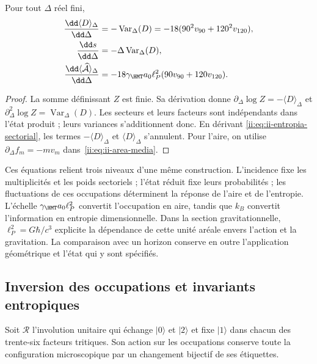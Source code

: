 \begin{proposition}
Pour tout $\Delta$ réel fini,
\begin{align}
 \frac{\dd\langle D\rangle_\Delta}{\dd\Delta}
 &=-\operatorname{Var}_\Delta(D)
   =-18(90^2v_{90}+120^2v_{120}),\\
 \frac{\dd s}{\dd\Delta}
 &=-\Delta\operatorname{Var}_\Delta(D),
 \label{ii:eq:ii-respuesta-entropica}\\
 \frac{\dd\langle\widehat{\mathcal A}\rangle_\Delta}{\dd\Delta}
 &=-18\gamma_{\HMT}a_0\ell_P^2(90v_{90}+120v_{120}).
 \label{ii:eq:ii-respuesta-areal}
\end{align}
\end{proposition}
\begin{proof}
La somme définissant $Z$ est finie. Sa dérivation donne
$\partial_\Delta\log Z=-\langle D\rangle_\Delta$ et
$\partial_\Delta^2\log Z=\operatorname{Var}_\Delta(D)$.
Les secteurs et leurs facteurs sont indépendants dans l'état produit ;
leurs variances s'additionnent donc. En dérivant
\eqref{ii:eq:ii-entropia-sectorial}, les termes
$-\langle D\rangle_\Delta$ et $\langle D\rangle_\Delta$
s'annulent. Pour l'aire, on utilise
$\partial_\Delta f_m=-mv_m$ dans~\eqref{ii:eq:ii-area-media}.
\end{proof}

Ces équations relient trois niveaux d'une même construction.
L'incidence fixe les multiplicités et les poids sectoriels ;
l'état réduit fixe leurs probabilités ; les fluctuations de ces
occupations déterminent la réponse de l'aire et de l'entropie.
L'échelle $\gamma_{\HMT}a_0\ell_P^2$ convertit l'occupation en aire,
tandis que $k_B$ convertit l'information en entropie dimensionnelle.
Dans la section gravitationnelle, $\ell_P^2=G\hbar/c^3$ explicite
la dépendance de cette unité aréale envers l'action et la gravitation.
La comparaison avec un horizon conserve en outre l'application
géométrique et l'état qui y sont spécifiés.

\subsection{Inversion des occupations et invariants entropiques}
\label{ii:sec:ii-inversion-sectorial}

Soit $\mathcal R$ l'involution unitaire qui échange $|0\rangle$
et $|2\rangle$ et fixe $|1\rangle$ dans chacun des trente-six
facteurs tritiques. Son action sur les occupations conserve toute la
configuration microscopique par un changement bijectif de ses étiquettes.

